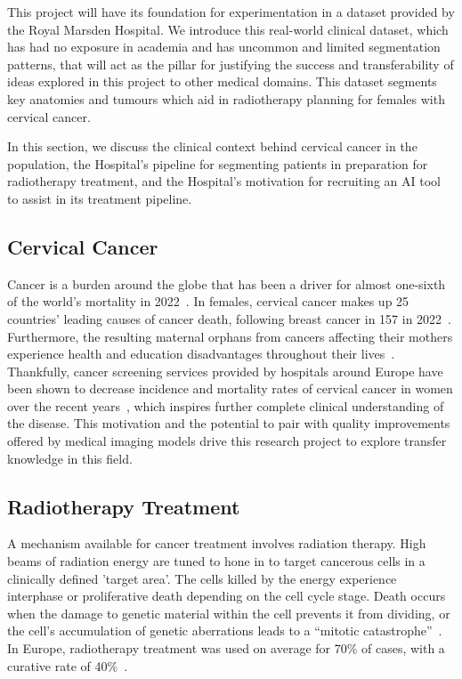 \documentclass[12pt,twoside]{report}
\begin{document}
This project will have its foundation for experimentation in a dataset provided by the Royal Marsden Hospital. We introduce this real-world clinical dataset, which has had no exposure in academia and has uncommon and limited segmentation patterns, that will act as the pillar for justifying the success and transferability of ideas explored in this project to other medical domains. This dataset segments key anatomies and tumours which aid in radiotherapy planning for females with cervical cancer.

In this section, we discuss the clinical context behind cervical cancer in the population, the Hospital's pipeline for segmenting patients in preparation for radiotherapy treatment, and the Hospital's motivation for recruiting an AI tool to assist in its treatment pipeline. 

\subsection{Cervical Cancer}\label{sect:cervical-cancer}

Cancer is a burden around the globe that has been a driver for almost one-sixth of the world's mortality in 2022~\cite{Global-cancer-2022}. In females, cervical cancer makes up 25 countries' leading causes of cancer death, following breast cancer in 157 in 2022~\cite{Global-cancer-2022}. Furthermore, the resulting maternal orphans from cancers affecting their mothers experience health and education disadvantages throughout their lives~\cite{Guida2022}. Thankfully, cancer screening services provided by hospitals around Europe have been shown to decrease incidence and mortality rates of cervical cancer in women over the recent years~\cite{Global-cancer-2022}, which inspires further complete clinical understanding of the disease. This motivation and the potential to pair with quality improvements offered by medical imaging models drive this research project to explore transfer knowledge in this field.

\subsection{Radiotherapy Treatment}

A mechanism available for cancer treatment involves radiation therapy. High beams of radiation energy are tuned to hone in to target cancerous cells in a clinically defined 'target area'. The cells killed by the energy experience interphase or proliferative death depending on the cell cycle stage. Death occurs when the damage to genetic material within the cell prevents it from dividing, or the cell's accumulation of genetic aberrations leads to a ``mitotic catastrophe''~\cite{cell-death}. In Europe, radiotherapy treatment was used on average for 70\% of cases, with a curative rate of 40\%~\cite{radiotherapy-advances, Thompson2018}.
\end{document}
